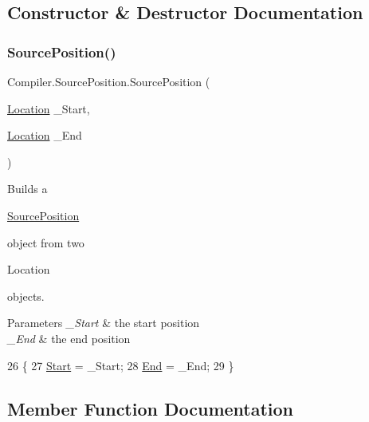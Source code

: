 \subsection{Constructor \& Destructor Documentation}
\mbox{\label{class_compiler_1_1_source_position_ac8eeb6d20c8a788dfe27345b435bb035}} 
\subsubsection{\texorpdfstring{Source\+Position()}{SourcePosition()}}
{\footnotesize\ttfamily Compiler.\+Source\+Position.\+Source\+Position (\begin{DoxyParamCaption}\item[{\mbox{\hyperlink{class_compiler_1_1_location}{Location}}}]{\+\_\+\+Start,  }\item[{\mbox{\hyperlink{class_compiler_1_1_location}{Location}}}]{\+\_\+\+End }\end{DoxyParamCaption})}

Builds a
\begin{DoxyCode}
\mbox{\hyperlink{class_compiler_1_1_source_position_ac8eeb6d20c8a788dfe27345b435bb035}{SourcePosition}} 
\end{DoxyCode}
 object from two
\begin{DoxyCode}
Location 
\end{DoxyCode}
 objects. 
\begin{DoxyParams}{Parameters}
{\em \+\_\+\+Start} & the start position \\
\hline
{\em \+\_\+\+End} & the end position \\
\hline
\end{DoxyParams}

\begin{DoxyCode}
26                                                                   \{
27                 \mbox{\hyperlink{class_compiler_1_1_source_position_ad7c78fd184a393fc62cb5ee8678db0c8}{Start}} = \_Start;
28                 \mbox{\hyperlink{class_compiler_1_1_source_position_af3d1f2d17f914b89789fff6207265829}{End}} = \_End;
29             \}
\end{DoxyCode}


\subsection{Member Function Documentation}
\mbox{\label{class_compiler_1_1_source_position_a95b14602e2629b906f29ef194d4f88f6}} 
